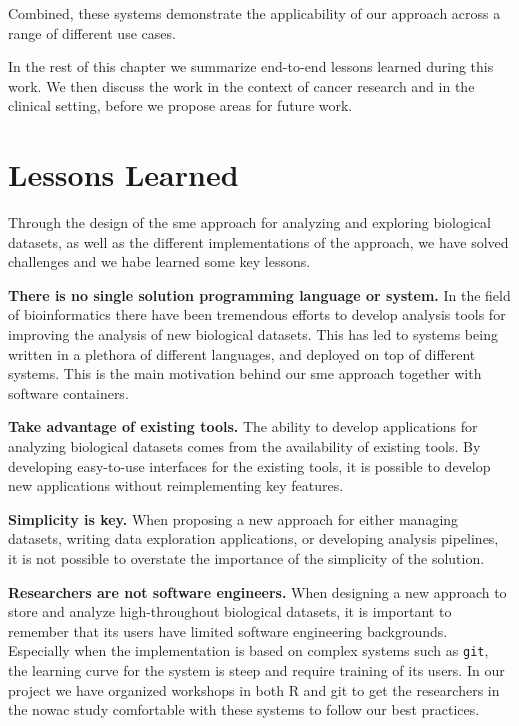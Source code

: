 Combined, these systems demonstrate the applicability of our approach across a
range of different use cases. 

In the rest of this chapter we summarize end-to-end lessons learned during this
work. We then discuss the work in the context of cancer research and in the clinical
setting,
before we propose areas for future work. 


\section{Lessons Learned}
Through the design of the \gls{sme} approach for analyzing and exploring
biological datasets, as well as the different implementations of the approach,
we have solved challenges and we habe learned some key lessons.

\textbf{There is no single solution programming language or system.} 
In the field of bioinformatics there have been tremendous efforts to develop
analysis tools for improving the analysis of new biological datasets.  This has
led to systems being written in a plethora of different languages, and deployed
on top of different systems. This is the main motivation behind our \gls{sme}
approach together with software containers.

\textbf{Take advantage of existing tools.} The ability to develop applications
for analyzing biological datasets comes from the availability of existing tools.
By developing easy-to-use interfaces for the existing tools, it is possible
to develop new applications without reimplementing key features. 

\textbf{Simplicity is key.} When proposing a new approach for either managing
datasets, writing data exploration applications, or developing analysis
pipelines, it is not possible to overstate the importance of the simplicity of
the solution. 

\textbf{Researchers are not software engineers.} 
When designing a new approach to store and analyze high-throughout biological
datasets, it is important to remember that its users have limited software
engineering backgrounds. Especially when the implementation is based on complex
systems such as \texttt{git}, the learning curve for the system is steep and
require training of its users. In our project we have organized workshops in
both R and git to get the researchers in the \gls{nowac} study comfortable with
these systems to follow our best practices. 


